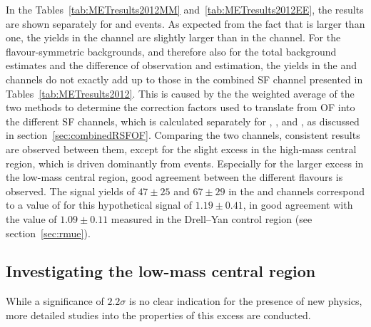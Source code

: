 
In the Tables~\ref{tab:METresults2012MM} and~\ref{tab:METresults2012EE}, the results are shown separately for \EE and \MM events. As expected from the fact that \rmue is larger than one, the yields in the \MM channel are slightly larger than in the \EE channel. For the flavour-symmetric backgrounds, and therefore also for the total background estimates and the difference of observation and estimation, the yields in the \EE and \MM channels do not exactly add up to those in the combined SF channel presented in Tables~\ref{tab:METresults2012}. This is caused by the the weighted average of the two methods to determine the correction factors used to translate from OF into the different SF channels, which is calculated separately for \Rsfof, \Reeof, and \Rmmof, as discussed in section~\ref{sec:combinedRSFOF}. Comparing the two channels, consistent results are observed between them, except for the slight excess in the high-mass central region, which is driven dominantly from \EE events. Especially for the larger excess in the low-mass central region, good agreement between the different flavours is observed. The signal yields of $47\pm25$ and $67\pm29$ in the \EE and \MM channels correspond to a value of \rmue for this hypothetical signal of $1.19\pm0.41$, in good agreement with the value of $1.09\pm0.11$ measured in the Drell--Yan control region (see section~\ref{sec:rmue}).





\subsection*{Investigating the low-mass central region}
While a significance of $2.2\sigma$ is no clear indication for the presence of new physics, more detailed studies into the properties of this excess are conducted. 

